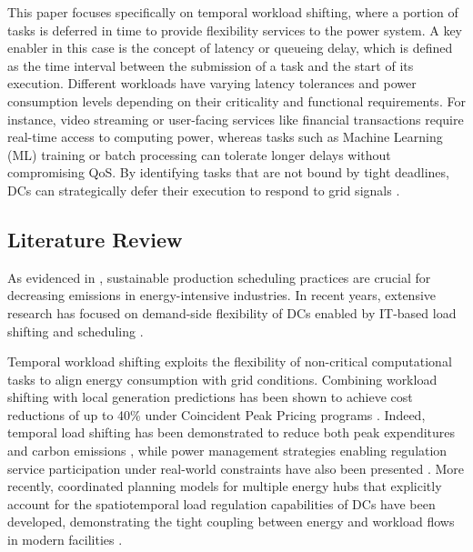 \documentclass[preprint,12pt]{elsarticle}
\begin{document}
This paper focuses specifically on temporal workload shifting, where a portion of tasks is deferred in time to provide flexibility services to the power system. A key enabler in this case is the concept of latency or queueing delay, which is defined as the time interval between the submission of a task and the start of its execution. %
Different workloads have varying latency tolerances and power consumption levels depending on their criticality and functional requirements. For instance, video streaming or user-facing services like financial transactions require real-time access to computing power, whereas tasks such as Machine Learning (ML) training or batch processing can tolerate longer delays without compromising QoS. By identifying tasks that are not bound by tight deadlines, DCs can strategically defer their execution to respond to grid signals \cite{Liu2013, Dabbagh2019}.






\subsection{Literature Review}\label{sec:literature_review}

As evidenced in \cite{Fisco-Compte2025}, sustainable production scheduling practices are crucial for decreasing emissions in energy-intensive industries. In recent years, extensive research has focused on demand-side flexibility of DCs enabled by IT-based load shifting and scheduling \cite{CHEN2020109466,CAO2022119665}.

Temporal workload shifting exploits the flexibility of non-critical computational tasks to align energy consumption with grid conditions. Combining workload shifting with local generation predictions has been shown to achieve cost reductions of up to 40\% under Coincident Peak Pricing programs \cite{Liu2013}. Indeed, temporal load shifting has been demonstrated to reduce both peak expenditures and carbon emissions \cite{Zhang2023_TSC}, while power management strategies enabling regulation service participation under real-world constraints have also been presented \cite{Zhang2021_DATE}. More recently, coordinated planning models for multiple energy hubs that explicitly account for the spatiotemporal load regulation capabilities of DCs have been developed, demonstrating the tight coupling between energy and workload flows in modern facilities \cite{Zhang2024_TPWRS}.
\end{document}
